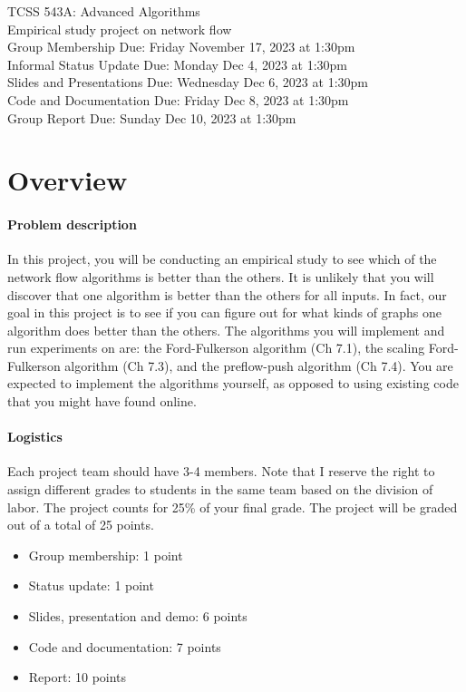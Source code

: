 \documentclass[11pt]{article}
\begin{document}
\begin{center}
\begin{large}
TCSS 543A: Advanced Algorithms\\
Empirical study project on network flow\\
Group Membership Due: Friday November 17, 2023 at 1:30pm\\
Informal Status Update Due: Monday Dec 4, 2023 at 1:30pm\\
Slides and Presentations Due: Wednesday Dec 6, 2023 at 1:30pm\\
Code and Documentation Due: Friday Dec 8, 2023 at 1:30pm\\
Group Report Due: Sunday Dec 10, 2023 at 1:30pm
\end{large}
\end{center}

\vskip 20pt

\section{Overview}
\paragraph{Problem description} In this project, you will be conducting an empirical study to see which of the network flow algorithms is better than the others. It is unlikely that you will discover that one algorithm is better than the others for all inputs. In fact, our goal in this project is to see if you can figure out for what kinds of graphs one algorithm does better than the others. The algorithms you will implement and run experiments on are: the Ford-Fulkerson algorithm (Ch 7.1), the scaling Ford-Fulkerson algorithm (Ch 7.3), and the preflow-push algorithm (Ch 7.4). You are expected to implement the algorithms yourself, as opposed to using existing code that you might have found online.

\paragraph{Logistics} Each project team should have 3-4 members. Note that I reserve the right to assign different grades to students in the same team based on the division of labor.  The project counts for 25\% of your final grade. The project will be graded out of a total of 25 points.
\begin{itemize}
\item Group membership: 1 point
\item Status update: 1 point
\item Slides, presentation and demo: 6 points
\item Code and documentation: 7 points
\item Report: 10 points 
\end{itemize}
\end{document}
